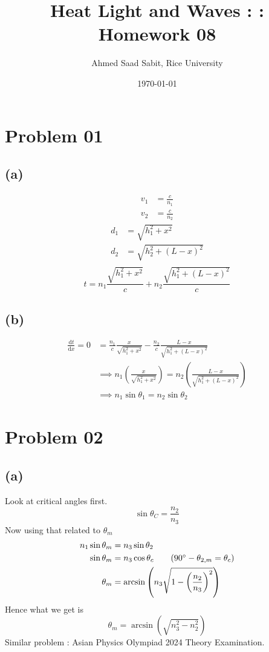 \documentclass[letter]{article}
\title{Heat Light and Waves : : Homework 08}
\author{Ahmed Saad Sabit, Rice University}
\date{\today}
\begin{document}
\maketitle
\section*{Problem 01}
\subsection*{(a)} 
\begin{align*}
	v_1 &= \frac{c}{n_1} \\
	v_2 &= \frac{c}{n_2} 
\end{align*} 
\begin{align*}
	d_1 &= \sqrt{h_1^2 + x^2}  \\
	d_2 &= \sqrt{h_2^2 + (L - x)^2}  \\
\end{align*}
\[
\boxed{
t = n_1 
\frac{\sqrt{h_1^2 + x^2} }{c} + 
n_2 
\frac{\sqrt{h_1^2 + (L - x)^2 } }{c}
}
\] 

\subsection*{(b)} 
\begin{align*}
	\frac{\mathrm{d} t}{\mathrm{d} x} = 0 &= \frac{n_1}{c} 
	\frac{x}{\sqrt{h_1^2 + x^2 }  } -
	\frac{n_2}{c} \frac{L-x}{\sqrt{h_1^2 + (L - x)^2 } } 
	\\
					      &\implies
					      n_1 
					      \left(\frac{x}{\sqrt{h_1^2 + x^2} }\right) 
					      =
					      n_2 
					      \left(\frac{L - x}{\sqrt{h_1^2 + (L - x)^2} }\right) \\ 
					      &\implies
					      n_1 \sin \theta_1 = n_2 \sin \theta_2 
\end{align*}



\section*{Problem 02} 
\subsection*{(a)} 
Look at critical angles first. 
\[
\sin \theta_C = \frac{n_2}{n_3}
\]
Now using that related to $\theta_m$
\begin{align*}
n_1 \sin \theta_m &= n_3 \sin \theta_2 \\
\sin \theta_m &= n_3 \cos \theta_c \tag{$90^{\circ} - \theta_{2,m} = \theta_c $} \\ 
\theta_m &= \arcsin \left(n_3 \sqrt{ 1 - \left(\frac{n_2}{n_3} \right)^2} \right) \\
\end{align*}
Hence what we get is 
\[\boxed{
\theta_m = \arcsin \left(\sqrt{n_3^2 - n_2^2} \right)
}\]
Similar problem : Asian Physics Olympiad 2024 Theory Examination. 
\end{document}
